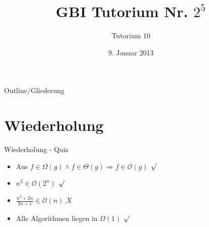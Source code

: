 

\title[Tutorium 10]{GBI Tutorium Nr. $2^5$}
\subtitle{Tutorium 10}
\date{9. Januar 2013}






	\begin{frame}
		\titlepage
	\end{frame}

	\begin{frame}{Outline/Gliederung}
		\tableofcontents
	\end{frame}	
		
	
	
	\section{Wiederholung} 
	\begin{frame} {Wiederholung - Quiz}
		\begin{itemize}
			\item Aus $f\in \Omega(g) \land f \in \Theta(g) \Rightarrow f \in \mathcal{O}(g)$
			\only<2-> {\color{darkgreen}$\surd$}\\
			\color{black}
					
			\item $n^5 \in \mathcal{O}(2^n)$
			\only<3-> {\color{darkgreen}$\surd$}\\
			\color{black}
	
			\item $\frac{n^3+2n}{2n+1} \in \mathcal{O}(n)$
			\only<4-> {\color{red}$X$}\\
			\color{black}
			
			\item Alle Algorithmen liegen in $\Omega(1)$
			\only<5-> {\color{darkgreen}$\surd$}\\
			\color{black}
		\end{itemize}
	\end{frame}
	
	
	
